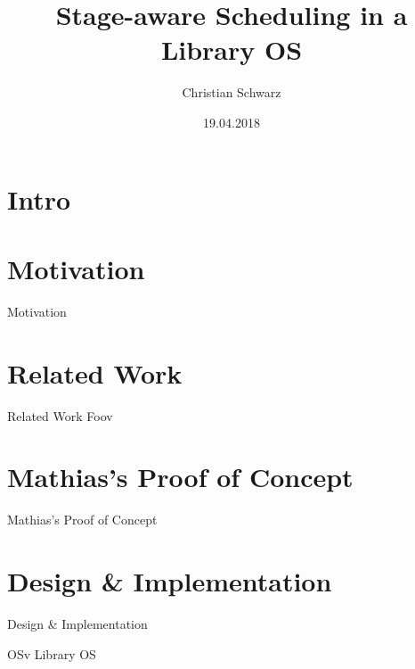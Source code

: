 \documentclass{beamer}
\begin{document}
\title{Stage-aware Scheduling in a Library OS}
\author{Christian Schwarz}
\subtitle{}
\date{19.04.2018}

\section{Intro}

\newcommand\follow{$\Rightarrow$}

\frame{\titlepage}

\section{Motivation}
\begin{frame}{Motivation}

\end{frame}

\section{Related Work}
\begin{frame}{Related Work}
    Foov
\end{frame}

\section{Mathias's Proof of Concept}
\begin{frame}{Mathias's Proof of Concept}

\end{frame}

\section{Design \& Implementation}
\begin{frame}{Design \& Implementation}

\end{frame}

\begin{frame}{OSv Library OS}

\end{frame}
\end{document}
